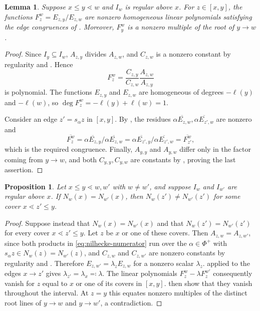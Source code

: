 \documentclass[11pt]{amsart}
\newtheorem{proposition}[proposition]{Proposition}
\newtheorem{lemma}[lemma]{Lemma}
\theoremstyle{definition}
\theoremstyle{remark}
\numberwithin{equation}{section}
\begin{document}
\begin{lemma}\label{lem:coatom-ratio}
Suppose $x\le y\lessdot w$ and $I_w$ is regular above $x$.
For $z\in[x,y]$, the functions $F^w_z=E_{z,y}/E_{z,w}$
are nonzero homogeneous linear polynomials satisfying the
edge congruences of . Moreover, $F^w_y$ is a nonzero multiple of the root of $y\to w$.
\end{lemma}
\begin{proof}
Since $I_y\subseteq I_w$, $A_{z,y}$ divides $A_{z,w}$, and $C_{z,w}$
is a nonzero constant by regularity and . Hence
\[
 F^w_z=\frac{C_{z,y}}{C_{z,w}}\frac{A_{z,w}}{A_{z,y}}
\]
is polynomial. The functions $E_{z,y}$ and $E_{z,w}$ are
homogeneous of degrees $-\ell(y)$ and $-\ell(w)$, so $\deg F^w_z=-\ell(y)+\ell(w)=1$.

Consider an edge $z'=s_\alpha z$ in $[x,y]$. By , the residues
$\overline{\alpha E_{z,w}},\overline{\alpha E_{z',w}}$ are nonzero and
\[
 \overline{F^w_z}=\overline{\alpha E_{z,y}}/\overline{\alpha E_{z,w}}=\overline{\alpha E_{z',y}}/\overline{\alpha E_{z',w}}=\overline{F^w_{z'}},
\]
which is the required congruence. Finally, $A_{y,y}$ and $A_{y,w}$ differ only in the factor coming from $y\to w$, and both $C_{y,y},C_{y,w}$ are constants by
, proving the last assertion.
\end{proof}

\begin{proposition}\label{prop:separation}
Let $x\le y\lessdot w,w'$ with $w\ne w'$,
and suppose $I_w$ and $I_{w'}$ are regular above $x$. If
$N_w(x)=N_{w'}(x)$, then $N_w(z')\ne N_{w'}(z')$ for
some cover $x\lessdot z'\le y$.
\end{proposition}
\begin{proof}
Suppose instead that $N_w(x)=N_{w'}(x)$ and that
$N_w(z')=N_{w'}(z')$ for every cover $x\lessdot z'\le y$. Let $z$ be
$x$ or one of these covers. Then $A_{z,w}=A_{z,w'}$, since both
products in \eqref{eq:nilhecke-numerator} run over the
$\alpha\in\Phi^+$ with $s_\alpha z\in N_w(z)=N_{w'}(z)$, and
$C_{z,w}$ and $C_{z,w'}$ are nonzero constants by regularity and
. Therefore
$E_{z,w'}=\lambda_zE_{z,w}$ for a nonzero scalar $\lambda_z$.
 applied to the edges $x \to z'$ gives $\lambda_{z'}=\lambda_x\eqqcolon\lambda$. The linear polynomials $F^w_z-\lambda F^{w'}_z$ consequently vanish
for $z$ equal to $x$ or one of its covers in $[x,y]$.
 then show that they vanish
throughout the interval. At $z=y$ this equates nonzero multiples of the distinct
root lines of $y\to w$ and $y\to w'$, a contradiction.
\end{proof}
\end{document}
